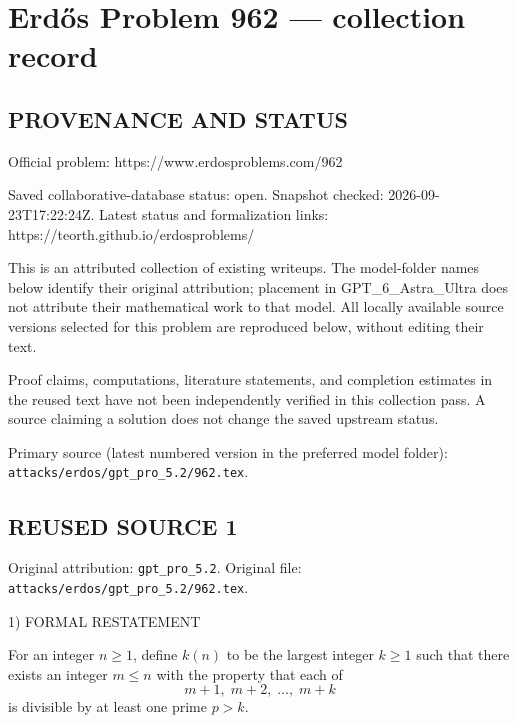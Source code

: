 \section*{Erd\H{o}s Problem 962 --- collection record}

\subsection*{PROVENANCE AND STATUS}
Official problem: https://www.erdosproblems.com/962

Saved collaborative-database status: open.
Snapshot checked: 2026-09-23T17:22:24Z.
Latest status and formalization links: https://teorth.github.io/erdosproblems/

This is an attributed collection of existing writeups. The model-folder names below identify their original attribution; placement in GPT\_6\_Astra\_Ultra does not attribute their mathematical work to that model. All locally available source versions selected for this problem are reproduced below, without editing their text.

Proof claims, computations, literature statements, and completion estimates in the reused text have not been independently verified in this collection pass. A source claiming a solution does not change the saved upstream status.

Primary source (latest numbered version in the preferred model folder): \texttt{attacks/erdos/gpt\_pro\_5.2/962.tex}.

\subsection*{REUSED SOURCE 1}
Original attribution: \texttt{gpt\_pro\_5.2}.
Original file: \texttt{attacks/erdos/gpt\_pro\_5.2/962.tex}.


1) FORMAL RESTATEMENT

For an integer $n\ge 1$, define $k(n)$ to be the largest integer $k\ge 1$ such that there exists an integer $m\le n$ with the property that each of
\[
 m+1,\;m+2,\;\dots,\;m+k
\]
is divisible by at least one prime $p>k$.

